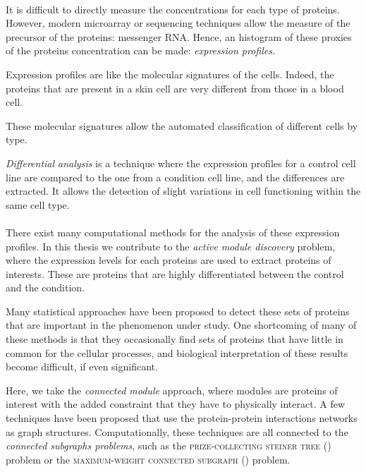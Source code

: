 \paragraph{}

It is difficult to directly measure the concentrations for each type of proteins.
However, modern microarray or sequencing techniques allow the measure of the precursor of the proteins: messenger RNA.
Hence, an histogram of these proxies of the proteins concentration can be made: \emph{expression profiles}.

Expression profiles are like the molecular signatures of the cells.
Indeed, the proteins that are present in a skin cell are very different from those in a blood cell.

These molecular signatures allow the automated classification of different cells by type.

\emph{Differential analysis} is a technique where the expression profiles for a control cell line are compared to the one from a condition cell line, and the differences are extracted.
It allows the detection of slight variations in cell functioning within the same cell type.

\paragraph{}

There exist many computational methods for the analysis of these expression profiles.
In this thesis we contribute to the \emph{active module discovery} problem, where the expression levels for each proteins are used to extract proteins of interests.
These are proteins that are highly differentiated between the control and the condition.

Many statistical approaches have been proposed to detect these sets of proteins that are important in the phenomenon under study.
One shortcoming of many of these methods is that they occasionally find sets of proteins that have little in common for the cellular processes, and biological interpretation of these results become difficult, if even significant.

Here, we take the \emph{connected module} approach, where modules are proteins of interest with the added constraint that they have to physically interact.
A few techniques have been proposed that use the protein-protein interactions networks as graph structures.
Computationally, these techniques are all connected to the \emph{connected subgraphs problems}, such as the \textsc{prize-collecting steiner tree} (\pcst{}) problem or the \textsc{maximum-weight connected subgraph} (\mwcs{}) problem.

